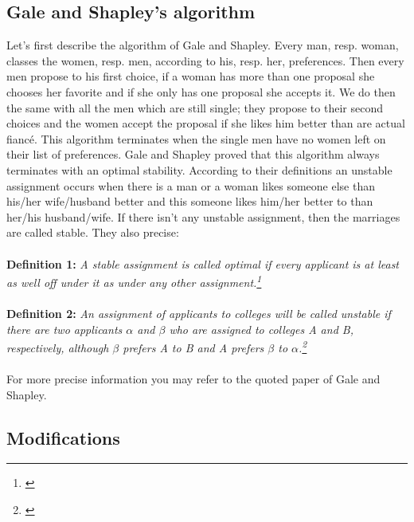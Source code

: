 \documentclass[11pt]{article}
\begin{document}
\subsection{Gale and Shapley’s algorithm}

Let’s first describe the algorithm of Gale and Shapley. Every man, resp. woman, classes the women, 
resp. men, according to his, resp. her, preferences. Then every men propose to his first choice, if a 
woman has more than one proposal she chooses her favorite and if she only has one proposal she 
accepts it. We do then the same with all the men which are still single; they propose to their second 
choices and the women accept the proposal if she likes him better than are actual fiancé. This 
algorithm terminates when the single men have no women left on their list of preferences.
Gale and Shapley proved that this algorithm always terminates with an optimal stability. According to 
their definitions an unstable assignment occurs when there is a man or a woman likes someone else 
than his/her wife/husband better and this someone likes him/her better to than her/his 
husband/wife. If there isn’t any unstable assignment, then the marriages are called stable. They also 
precise:
\\
\\
\textbf{Definition 1: }\textit{A stable assignment is called optimal if every applicant is at
least as well off under it as under any other assignment.\footnote{\citet{1962}}}
\label{eq:stable}
\\
\\
\textbf{Definition 2: }\textit{An assignment of applicants to colleges will be called unstable if there are two applicants
 $\alpha$ and $\beta$ who are assigned to colleges A and B, respectively, although $\beta$ prefers A to B and A prefers $\beta$
  to $\alpha$.\footnote{\citet{1962}}}
\label{eq:2}
\\
\\
For more precise information you may refer to the quoted paper of Gale and Shapley.

\subsection{Modifications} \label{mods}
\end{document}
